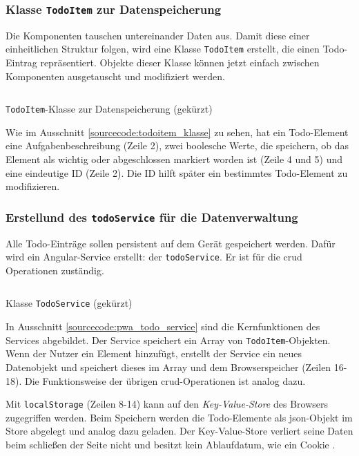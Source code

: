 \subsubsection{Klasse \texttt{TodoItem} zur Datenspeicherung}

Die Komponenten tauschen untereinander Daten aus. Damit diese einer einheitlichen Struktur folgen, wird eine Klasse \texttt{TodoItem} erstellt, die einen Todo-Eintrag repräsentiert. Objekte dieser Klasse können jetzt einfach zwischen Komponenten ausgetauscht und modifiziert werden.

\begin{listing}[h!]
	\inputminted{TypeScript}{sourcecode/pwa_todoitem_klasse.js}
	\caption{\texttt{TodoItem}-Klasse zur Datenspeicherung (gekürzt)}
	\label{sourcecode:todoitem_klasse}
\end{listing}

Wie im Ausschnitt \ref{sourcecode:todoitem_klasse} zu sehen, hat ein Todo-Element eine Aufgabenbeschreibung (Zeile 2), zwei boolesche Werte, die speichern, ob das Element als wichtig oder abgeschlossen markiert worden ist (Zeile 4 und 5) und eine eindeutige ID (Zeile 2). Die ID hilft später ein bestimmtes Todo-Element zu modifizieren.

\subsubsection{Erstellund des \texttt{todoService} für die Datenverwaltung}
Alle Todo-Einträge sollen persistent auf dem Gerät gespeichert werden. Dafür wird ein Angular-Service erstellt: der \texttt{todoService}. Er ist für die \acf{crud} Operationen zuständig.

\begin{listing}[h!]
	\inputminted{TypeScript}{sourcecode/pwa_todo_service.ts}
	\caption{Klasse \texttt{TodoService} (gekürzt)}
	\label{sourcecode:pwa_todo_service}
\end{listing}

In Ausschnitt \ref{sourcecode:pwa_todo_service} sind die Kernfunktionen des Services abgebildet. Der Service speichert ein Array von \texttt{TodoItem}-Objekten. Wenn der Nutzer ein Element hinzufügt, erstellt der Service ein neues Datenobjekt und speichert dieses im Array und dem Browserspeicher (Zeilen 16-18). Die Funktionsweise der übrigen \ac{crud}-Operationen ist analog dazu.

Mit \texttt{localStorage} (Zeilen 8-14) kann auf den\textit{ Key-Value-Store} des Browsers zugegriffen werden. Beim Speichern werden die Todo-Elemente als \ac{json}-Objekt im Store abgelegt und analog dazu geladen. Der Key-Value-Store verliert seine Daten beim schließen der Seite nicht und besitzt kein Ablaufdatum, wie ein Cookie \cite{LocalStorage}.

